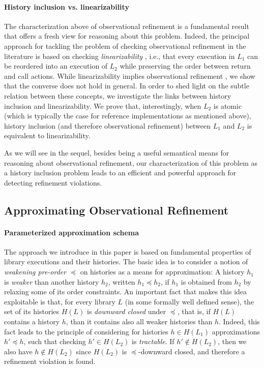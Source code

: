 \paragraph{History inclusion vs. linearizability}

The characterization above of observational refinement is a fundamental result
that offers a fresh view for reasoning about this problem. Indeed, the
principal approach for tackling the problem of checking observational refinement
in the literature is based on checking \emph{linearizability} \cite{}, i.e.,
that every execution in $L_1$ can be reordered into an execution of $L_2$ while
preserving the order between return and call actions. While linearizability
implies observational refinement \cite{}, we show that the converse does not
hold in general. In order to shed light on the subtle relation between these
concepts, we investigate the links between history inclusion and
linearizability. We prove that, interestingly, when $L_2$ is atomic (which is
typically the case for reference implementations as mentioned above), history
inclusion (and therefore observational refinement) between $L_1$ and $L_2$ is
equivalent to linearizability.

As we will see in the sequel, besides being a useful semantical means for
reasoning about observational refinement, our characterization of this problem
as a history inclusion problem leads to an efficient and powerful approach for
detecting refinement violations.


\subsection{Approximating Observational Refinement}
\label{sec:intro:approx}

\paragraph{Parameterized approximation schema}

The approach we introduce in this paper is based on fundamental properties of
library executions and their histories. The basic idea is to consider a notion
of \emph{weakening pre-order} $\preceq$ on histories as a means for
approximation: A history $h_1$ is \emph{weaker} than another history $h_2$,
written $h_1 \preceq h_2$, if $h_1$ is obtained from $h_2$ by relaxing some of
its order constraints. An important fact that makes this idea exploitable is
that, for every library $L$ (in some formally well defined sense), the set of
its histories $H(L)$ is \emph{downward closed} under $\preceq$, that is, if
$H(L)$ contains a history $h$, than it contains also all weaker histories than
$h$. Indeed, this fact leads to the principle of considering for histories $h
\in H(L_1)$ approximations $h' \preceq h$, such that checking $h' \in H(L_2)$
is \emph{tractable}. If $h' \not\in H(L_2)$, then we also have $h \not\in
H(L_2)$ since $H(L_2)$ is $\preceq$-downward closed, and therefore a refinement
violation is found.

